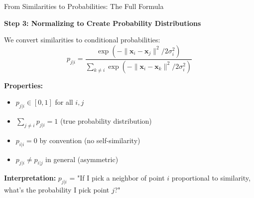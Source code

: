 \documentclass[10pt]{beamer}
\begin{document}
\begin{frame}{From Similarities to Probabilities: The Full Formula}

\textbf{Step 3: Normalizing to Create Probability Distributions}

\vspace{0.2cm}
We convert similarities to conditional probabilities:
\begin{equation}
p_{j|i} = \frac{\exp\left(-\|\mathbf{x}_i - \mathbf{x}_j\|^2 / 2\sigma_i^2\right)}{\sum_{k \neq i} \exp\left(-\|\mathbf{x}_i - \mathbf{x}_k\|^2 / 2\sigma_i^2\right)}
\end{equation}

\vspace{0.2cm}
\textbf{Properties:}
\begin{itemize}
    \item $p_{j|i} \in [0,1]$ for all $i,j$
    \item $\sum_{j \neq i} p_{j|i} = 1$ (true probability distribution)
    \item $p_{i|i} = 0$ by convention (no self-similarity)
    \item $p_{j|i} \neq p_{i|j}$ in general (asymmetric)
\end{itemize}

\vspace{0.2cm}
\textbf{Interpretation:} $p_{j|i}$ = "If I pick a neighbor of point $i$ proportional to similarity, what's the probability I pick point $j$?"

\vspace{0.2cm}
\begin{figure}
\centering
{}
\end{figure}

\end{frame}
\end{document}
